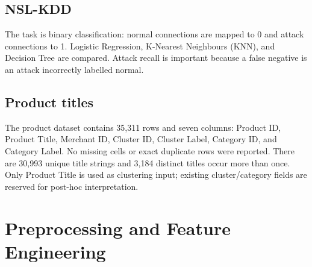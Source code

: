 \documentclass[conference]{IEEEtran}
\begin{document}
\subsection{NSL-KDD}
The task is binary classification: normal connections are mapped to 0 and attack connections to 1. Logistic Regression, K-Nearest Neighbours (KNN), and Decision Tree are compared. Attack recall is important because a false negative is an attack incorrectly labelled normal.
\subsection{Product titles}
The product dataset contains 35,311 rows and seven columns: Product ID, Product Title, Merchant ID, Cluster ID, Cluster Label, Category ID, and Category Label. No missing cells or exact duplicate rows were reported. There are 30,993 unique title strings and 3,184 distinct titles occur more than once. Only Product Title is used as clustering input; existing cluster/category fields are reserved for post-hoc interpretation.

\section{Preprocessing and Feature Engineering}
\end{document}
